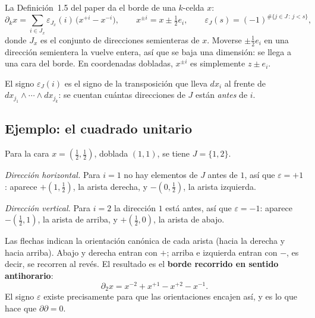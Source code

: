 \documentclass[11pt,a4paper]{article}
\theoremstyle{plain}
\theoremstyle{remark}
\begin{document}
La Definición~1.5 del paper da el borde de una $k$-celda $x$:
\[
\partial_k x=\sum_{i\in J_x}\varepsilon_{J_x}(i)\,\big(x^{+i}-x^{-i}\big),\qquad
x^{\pm i}=x\pm\tfrac12e_i,\qquad
\varepsilon_J(s)=(-1)^{\#\{j\in J\,:\,j<s\}},
\]
donde $J_x$ es el conjunto de direcciones semienteras de $x$. Moverse $\pm\frac12 e_i$ en una dirección semientera la vuelve entera, así que se baja una dimensión: se llega a una cara del borde. En coordenadas dobladas, $x^{\pm i}$ es simplemente $z\pm e_i$.

El signo $\varepsilon_J(i)$ es el signo de la transposición que lleva $dx_i$ al frente de $dx_{j_1}\wedge\cdots\wedge dx_{j_k}$: se cuentan cuántas direcciones de $J$ están \emph{antes} de $i$.

\subsection{Ejemplo: el cuadrado unitario}

Para la cara $x=(\frac12,\frac12)$, doblada $(1,1)$, se tiene $J=\{1,2\}$.

\noindent\textit{Dirección horizontal.} Para $i=1$ no hay elementos de $J$ antes de $1$, así que $\varepsilon=+1$: aparece $+(1,\frac12)$, la arista derecha, y $-(0,\frac12)$, la arista izquierda.

\noindent\textit{Dirección vertical.} Para $i=2$ la dirección $1$ está antes, así que $\varepsilon=-1$: aparece $-(\frac12,1)$, la arista de arriba, y $+(\frac12,0)$, la arista de abajo.

\begin{center}
\end{center}

Las flechas indican la orientación canónica de cada arista (hacia la derecha y hacia arriba). Abajo y derecha entran con $+$; arriba e izquierda entran con $-$, es decir, se recorren al revés. El resultado es el \textbf{borde recorrido en sentido antihorario}:
\[
\partial_2 x = x^{-2}+x^{+1}-x^{+2}-x^{-1}.
\]
El signo $\varepsilon$ existe precisamente para que las orientaciones encajen así, y es lo que hace que $\partial\partial=0$.
\end{document}
